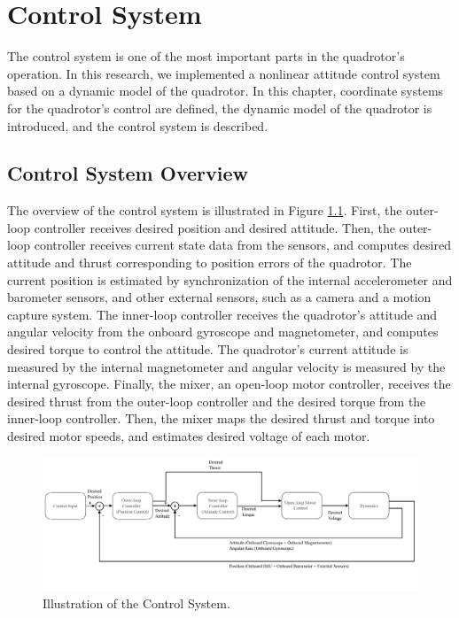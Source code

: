 \chapter{Control System}
\label{ch:control_system}

The control system is one of the most important parts in the quadrotor's operation. In this research, we implemented a nonlinear attitude control system based on a dynamic model of the quadrotor. In this chapter, coordinate systems for the quadrotor's control are defined, the dynamic model of the quadrotor is introduced, and the control system is described.

\section{Control System Overview}
\label{sec:control_system_system_overview}

The overview of the control system is illustrated in Figure \ref{fig:bode}. First, the outer-loop controller receives desired position and desired attitude. Then, the outer-loop controller receives current state data from the sensors, and computes desired attitude and thrust corresponding to position errors of the quadrotor. The current position is estimated by synchronization of the internal accelerometer and barometer sensors, and other external sensors, such as a camera and a motion capture system. The inner-loop controller receives the quadrotor's attitude and angular velocity from the onboard gyroscope and magnetometer, and computes desired torque to control the attitude. The quadrotor's current attitude is measured by the internal magnetometer and angular velocity is measured by the internal gyroscope. Finally, the mixer, an open-loop motor controller, receives the desired thrust from the outer-loop controller and the desired torque from the inner-loop controller. Then, the mixer maps the desired thrust and torque into desired motor speeds, and estimates desired voltage of each motor.

\begin{figure}
    \centering
    \includegraphics[width=1\textwidth]{graphics/bode_diagram.pdf}
    \caption{Illustration of the Control System.}
    \label{fig:bode}
\end{figure}

